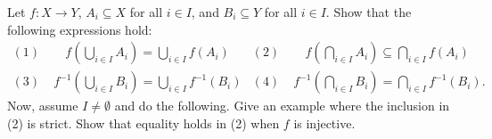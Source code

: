 \begin{problem}
Let $f \colon X\rightarrow Y$, $A_i \subseteq X$ for all $i\in I$, and $B_i \subseteq Y$ for all $i\in I$.
Show that the following expressions hold:
\begin{align*}
(1) & \;\;\;\:\, f \left( \bigcup_{i\in I} A_i \right) = \bigcup_{i\in I} f \left( A_i \right) &
(2) & \;\;\;\:\, f \left( \bigcap_{i\in I} A_i \right) \subseteq \bigcap_{i\in I} f \left( A_i \right) \\
(3) & \; f^{-1} \left( \bigcup_{i\in I} B_i \right) = \bigcup_{i\in I} f^{-1} \left( B_i \right) &
(4) & \; f^{-1} \left( \bigcap_{i\in I} B_i \right) = \bigcap_{i\in I} f^{-1} \left( B_i \right). 
\end{align*}
Now, assume $I\ne\emptyset$ and do the following.
Give an example where the inclusion in (2) is strict.
Show that equality holds in (2) when $f$ is injective.
\end{problem}
